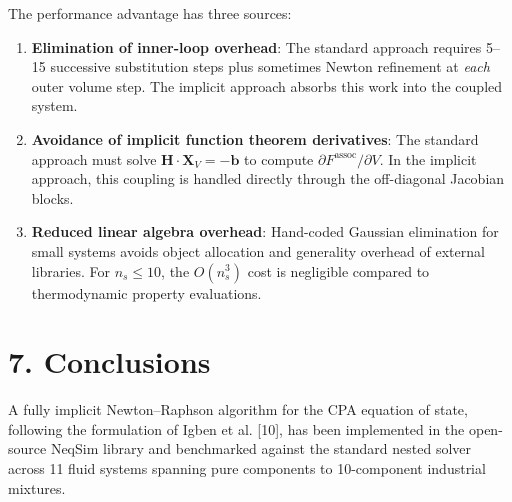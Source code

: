 \documentclass[review,3p]{elsarticle}
\begin{document}
The performance advantage has three sources:

\begin{enumerate}
  \item \textbf{Elimination of inner-loop overhead}: The standard approach requires 5–15 successive substitution steps plus sometimes Newton refinement at \textit{each} outer volume step. The implicit approach absorbs this work into the coupled system.

  \item \textbf{Avoidance of implicit function theorem derivatives}: The standard approach must solve $\mathbf{H} \cdot \mathbf{X}_V = -\mathbf{b}$ to compute $\partial F^{\text{assoc}} / \partial V$. In the implicit approach, this coupling is handled directly through the off-diagonal Jacobian blocks.

  \item \textbf{Reduced linear algebra overhead}: Hand-coded Gaussian elimination for small systems avoids object allocation and generality overhead of external libraries. For $n_s \leq 10$, the $O(n_s^3)$ cost is negligible compared to thermodynamic property evaluations.
\end{enumerate}


\section{7. Conclusions}

A fully implicit Newton–Raphson algorithm for the CPA equation of state, following the formulation of Igben et al. [10], has been implemented in the open-source NeqSim library and benchmarked against the standard nested solver across 11 fluid systems spanning pure components to 10-component industrial mixtures.
\end{document}
